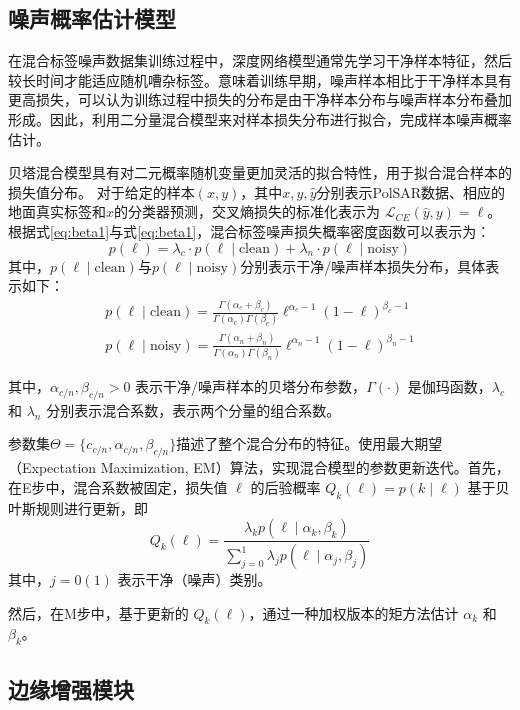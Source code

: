 \subsection{噪声概率估计模型}
在混合标签噪声数据集训练过程中，深度网络模型通常先学习干净样本特征，然后较长时间才能适应随机嘈杂标签。意味着训练早期，噪声样本相比于干净样本具有更高损失，可以认为训练过程中损失的分布是由干净样本分布与噪声样本分布叠加形成。因此，利用二分量混合模型来对样本损失分布进行拟合，完成样本噪声概率估计。

贝塔混合模型具有对二元概率随机变量更加灵活的拟合特性\citing{}，用于拟合混合样本的损失值分布。
对于给定的样本$(x, y)$，其中$x, y, \hat{y}$分别表示PolSAR数据、相应的地面真实标签和$x$的分类器预测，交叉熵损失的标准化表示为 $\mathcal{L}_{CE}(\hat{y}, y) = \ell$。根据式\ref{eq:beta1}与式\ref{eq:beta1}，混合标签噪声损失概率密度函数可以表示为：
\begin{equation}
    p(\ell)=\lambda_c \cdot p(\ell \mid \text{clean})+\lambda_n \cdot p(\ell \mid \text{noisy})
\end{equation}
其中，$p(\ell \mid \text{clean})$与$p(\ell \mid \text{noisy})$分别表示干净/噪声样本损失分布，具体表示如下：
\begin{gather}
    p(\ell \mid \text{clean})=\frac{\Gamma(\alpha_c+\beta_c)}{\Gamma(\alpha_c) \Gamma(\beta_c)} \ell^{\alpha_c-1}(1-\ell)^{\beta_c-1} \\
    p(\ell \mid \text{noisy})=\frac{\Gamma(\alpha_n+\beta_n)}{\Gamma(\alpha_n) \Gamma(\beta_n)} \ell^{\alpha_n-1}(1-\ell)^{\beta_n-1}
\end{gather}

其中，$\alpha_{c/n}, \beta_{c/n} > 0$ 表示干净/噪声样本的贝塔分布参数，$\Gamma(\cdot)$ 是伽玛函数，$\lambda_{c}$ 和 $\lambda_{n}$ 分别表示混合系数，表示两个分量的组合系数。

参数集$\Theta = \{c_{c/n}, \alpha_{c/n}, \beta_{c/n}\}$描述了整个混合分布的特征。使用最大期望（Expectation Maximization, EM）算法，实现混合模型的参数更新迭代。首先，在E步中，混合系数被固定，损失值 \(\ell\) 的后验概率 \(Q_k(\ell)=p(k \mid \ell)\) 基于贝叶斯规则进行更新，即
\begin{equation}
    Q_k(\ell)=\frac{\lambda_k p(\ell \mid \alpha_k, \beta_k)}{\sum_{j=0}^{1}\lambda_j p(\ell \mid \alpha_j, \beta_j)}
\end{equation}
其中，$j=0(1)$ 表示干净（噪声）类别。

然后，在M步中，基于更新的 \(Q_k(\ell)\)，通过一种加权版本的矩方法估计 \(\alpha_k\) 和 \(\beta_k\)。

\subsection{边缘增强模块}

